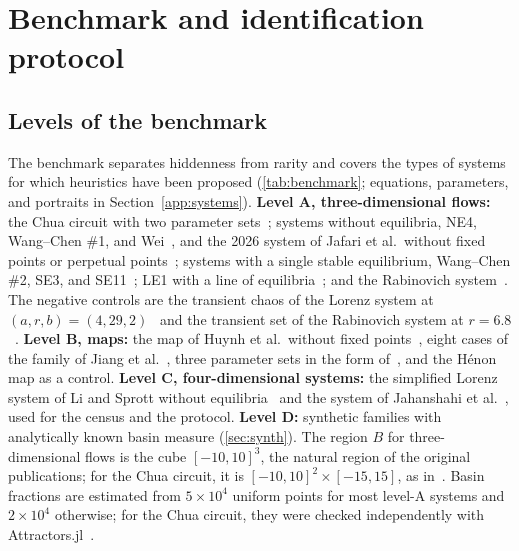 \section{Benchmark and identification protocol}\label{sec:bench}

\subsection{Levels of the benchmark}\label{sec:levels}

The benchmark separates hiddenness from rarity and covers the types of systems for which heuristics have been proposed (\cref{tab:benchmark}; equations, parameters, and portraits in Section~\ref{app:systems}).
\textbf{Level A, three-dimensional flows:} the Chua circuit with two parameter sets~\cite{Leonov2011PLA,GuanXie2025,Kuznetsov2023Chua}; systems without equilibria, NE4, Wang--Chen \#1, and Wei~\cite{Wei2011,JafariSprottGolpayegani2013}, and the 2026 system of Jafari et al.\ without fixed points or perpetual points~\cite{Jafari2026NoPP}; systems with a single stable equilibrium, Wang--Chen \#2, SE3, and SE11~\cite{WangChen2012,Molaie2013}; LE1 with a line of equilibria~\cite{JafariSprott2013}; and the Rabinovich system~\cite{Kuznetsov2018Rabinovich}. The negative controls are the transient chaos of the Lorenz system at $(a,r,b)=(4,29,2)$~\cite{YorkeYorke1979} and the transient set of the Rabinovich system at $r=6.8$~\cite{SprottMunmuangsaen2018Comment}.
\textbf{Level B, maps:} the map of Huynh et al.\ without fixed points~\cite{Huynh2019}, eight cases of the family of Jiang et al.~\cite{Jiang2016Maps}, three parameter sets in the form of~\cite{Ouannas2018}, and the H\'enon map as a control.
\textbf{Level C, four-dimensional systems:} the simplified Lorenz system of Li and Sprott without equilibria~\cite{LiSprott2014} and the system of Jahanshahi et al.~\cite{Jahanshahi2019}, used for the census and the protocol.
\textbf{Level D:} synthetic families with analytically known basin measure (\cref{sec:synth}).
The region $B$ for three-dimensional flows is the cube $[-10,10]^3$, the natural region of the original publications; for the Chua circuit, it is $[-10,10]^2\times[-15,15]$, as in~\cite{Zelinka2016}. Basin fractions are estimated from $5\times10^4$ uniform points for most level-A systems and $2\times10^4$ otherwise; for the Chua circuit, they were checked independently with Attractors.jl~\cite{Datseris2018JOSS,DatserisWagemakers2022}.

